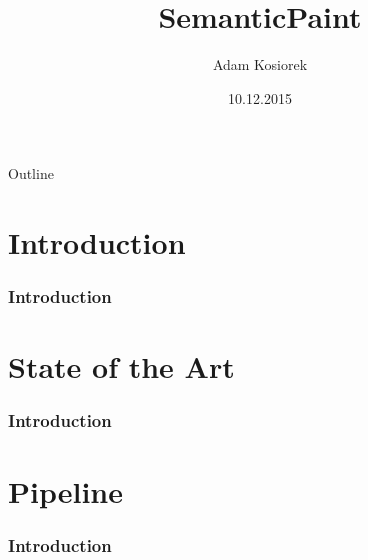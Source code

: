 \documentclass[mathserif]{beamer}
\title[short title]{SemanticPaint}
\author[short presentator]{Adam Kosiorek}
\institute[CAMP]{Computer Aided Medical Procedures \\
Technische Universit\"at M\"unchen}
\date[]{10.12.2015}
\begin{document}
%   
%   
% 
%   
%   
%   


\begin{frame}
\titlepage
\end{frame}


\begin{frame}{Outline}
\tableofcontents
\end{frame}


\section{Introduction}
\begin{frame}
\frametitle{Introduction}

\end{frame}

\section{State of the Art}
\begin{frame}
\frametitle{Introduction}

\end{frame}

\section{Pipeline}
\begin{frame}
\frametitle{Introduction}

\end{frame}
\end{document}
